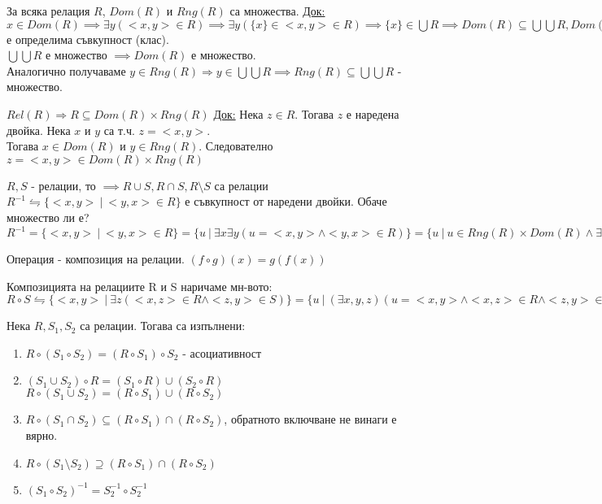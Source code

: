 \documentclass[fleqn, titlepage, 12pt]{report}
\begin{document}
 За всяка релация $R$, $Dom(R)$ и $Rng(R)$ са множества.
\bigbreak
\underline{Док:} $x \in Dom(R) \implies \exists{y}(<x,y> \in R) \implies \exists{y}( \{ x\} \in <x,y> \in R) \implies \{ x\} \in \bigcup R \implies Dom(R) \subseteq \bigcup \bigcup R, Dom(R)$ е определима съвкупност (клас).\\
$\bigcup \bigcup R$ е множество $ \implies Dom(R)$ е множество.\\
Аналогично получаваме $y \in Rng(R) \Rightarrow y \in \bigcup \bigcup R \implies Rng(R) \subseteq \bigcup \bigcup R$ - множество.
\bigbreak

 $Rel(R) \Rightarrow R \subseteq Dom(R) \times Rng(R)$
\bigbreak
\underline{Док:} Нека $z \in R$. Тогава $z$ е наредена двойка. Нека $x$ и $y$ са т.ч. $z = <x,y>$.\\
Тогава $x \in Dom(R)$ и $y \in Rng(R)$. Следователно $z = <x,y> \in Dom(R) \times Rng(R)$
\bigbreak

 $R,S$ - релации, то $\implies R \cup S, R \cap S, R \setminus S$ са релации\\
$R^{-1} \leftrightharpoons \{<x,y>\ |\ <y,x> \in R\}$ е съвкупност от наредени двойки. Обаче множество ли е?\\
$R^{-1} = \{<x,y>\ |\ <y,x> \in R\} = \{u\ |\ \exists{x}\exists{y}(u = <x,y> \land <y,x> \in R)\}
= \{u\ |\ u \in Rng(R) \times Dom(R) \land \exists{x,y}(u = <x,y> \land <y,x> \in R)\}$
\bigbreak

 Операция - композиция на релации. $(f \circ g)(x) = g(f(x))$
\bigbreak

 Композицията на релациите R и S наричаме мн-вото:\\
$R \circ S \leftrightharpoons \{<x,y>\ |\ \exists{z}(<x,z> \in R \land <z,y> \in S)\}
= \{u\ |\ (\exists{x,y,z})(u = <x,y> \land <x,z> \in R \land <z,y> \in S)\}
= \{u\ |\ u \in Dom(R) \times Rng(S) \land (\exists{x,y,z})(u = <x,y> \land <x,z> \in R \land <z,y> \in S)\}$
\bigbreak

 Нека $R, S_1, S_2$ са релации. Тогава са изпълнени:
\begin{enumerate}
  \item $R\circ (S_1\circ S_2) = (R\circ S_1)\circ S_2$ - асоциативност
  \item $(S_1 \cup S_2)\circ R = (S_1\circ R) \cup (S_2\circ R)$\\
    $R \circ (S_1 \cup S_2) = (R \circ S_1) \cup (R \circ S_2)$
  \item $R \circ (S_1 \cap S_2) \subseteq (R \circ S_1) \cap (R \circ S_2)$, обратното включване не винаги е вярно.
  \item $R \circ (S_1 \setminus S_2) \supseteq (R \circ S_1) \cap (R \circ S_2)$
  \item $(S_1 \circ S_2)^{-1} = S_2^{-1} \circ S_2^{-1}$
\end{enumerate}
\bigbreak
\end{document}
